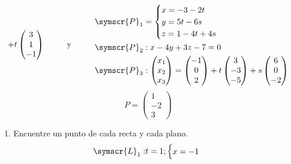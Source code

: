 \documentclass{article}
\def\fancyL{\symscr{L}}
\def\fancyP{\symscr{P}}
\begin{document}
\begin{enumerate}
\[\begin{aligned}
            +
            t\begin{pmatrix}3 \\ 1 \\ -1\end{pmatrix}
        \end{aligned}
        \hspace{1cm}
        \text{y}
        \hspace{1cm}
        \begin{aligned}
            \fancyP_1 &=
            \begin{cases}
                x = -3 -2t \\
                y = 5t - 6s \\ 
                z = 1 - 4t + 4s
            \end{cases} \\
            \fancyP_2 &:
            x - 4y + 3z - 7 = 0 \\ 
            \fancyP_3 &:
            \begin{pmatrix}x_1 \\ x_2 \\ x_3\end{pmatrix}
            =
            \begin{pmatrix}-1 \\ 0 \\ 2\end{pmatrix}
            + t\begin{pmatrix}3 \\ -3 \\ -5\end{pmatrix}
            + s\begin{pmatrix}6 \\ 0 \\ -2\end{pmatrix}
        \end{aligned}
    \]
    \[
        P = \begin{pmatrix}
            1 \\ -2 \\ 3
        \end{pmatrix}
    \]
    \begin{enumerate}[label=\listAlph]
		\item Encuentre un punto de cada recta y cada plano.
            \[
                \begin{aligned}
                    \fancyL_1:&
                    t = 1;
                    \begin{cases}
                        x = -1 \\

\end{cases}
\end{aligned}\]
\end{enumerate}
\end{enumerate}
\end{document}
